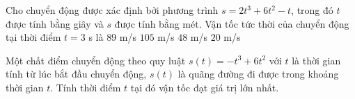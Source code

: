 \begin{ex}%
	Cho chuyển động được xác định  bởi phương trình $s=2t^{3}+6t^{2}-t$, trong đó $t$ được tính bằng giây và $s$ được tính bằng mét. Vận tốc tức thời của chuyển động tại thời điểm $t=3$ s là
	\choice 
		{\True $89$  m/s}
		{$105$  m/s}
		{$48$ m/s} 
		{$20$  m/s}
\end{ex}

\begin{ex}%
	Một chất điểm chuyển động theo quy luật $s(t)=-t^3+6t^2$ với $t$ là thời gian  tính từ lúc bắt đầu chuyển động, $s(t)$ là quãng đường đi được trong khoảng thời gian $t$. Tính thời điểm $t$ tại đó vận tốc đạt giá trị lớn nhất.
\end{ex}

